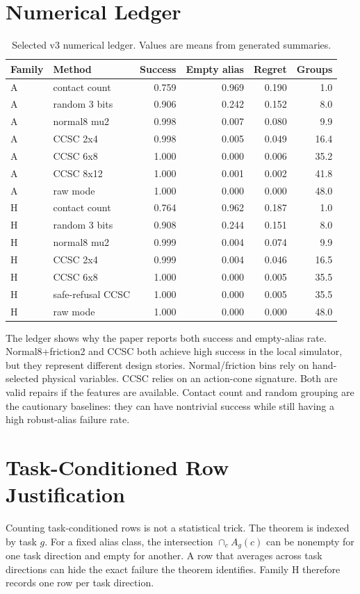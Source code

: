 \documentclass{article}
\begin{document}
\section{Numerical Ledger}
\begin{table}[p]
\centering
\caption{Selected v3 numerical ledger. Values are means from generated summaries.}
\label{tab:numerical-ledger}
\small
\begin{tabular}{llrrrr}
\toprule
Family & Method & Success & Empty alias & Regret & Groups\\
\midrule
A & contact count & 0.759 & 0.969 & 0.190 & 1.0\\
A & random 3 bits & 0.906 & 0.242 & 0.152 & 8.0\\
A & normal8 mu2 & 0.998 & 0.007 & 0.080 & 9.9\\
A & CCSC 2x4 & 0.998 & 0.005 & 0.049 & 16.4\\
A & CCSC 6x8 & 1.000 & 0.000 & 0.006 & 35.2\\
A & CCSC 8x12 & 1.000 & 0.001 & 0.002 & 41.8\\
A & raw mode & 1.000 & 0.000 & 0.000 & 48.0\\
\midrule
H & contact count & 0.764 & 0.962 & 0.187 & 1.0\\
H & random 3 bits & 0.908 & 0.244 & 0.151 & 8.0\\
H & normal8 mu2 & 0.999 & 0.004 & 0.074 & 9.9\\
H & CCSC 2x4 & 0.999 & 0.004 & 0.046 & 16.5\\
H & CCSC 6x8 & 1.000 & 0.000 & 0.005 & 35.5\\
H & safe-refusal CCSC & 1.000 & 0.000 & 0.005 & 35.5\\
H & raw mode & 1.000 & 0.000 & 0.000 & 48.0\\
\bottomrule
\end{tabular}
\end{table}

The ledger shows why the paper reports both success and empty-alias rate. Normal8+friction2 and CCSC both achieve high success in the local simulator, but they represent different design stories. Normal/friction bins rely on hand-selected physical variables. CCSC relies on an action-cone signature. Both are valid repairs if the features are available. Contact count and random grouping are the cautionary baselines: they can have nontrivial success while still having a high robust-alias failure rate.

\section{Task-Conditioned Row Justification}
Counting task-conditioned rows is not a statistical trick. The theorem is indexed by task $g$. For a fixed alias class, the intersection $\cap_c A_g(c)$ can be nonempty for one task direction and empty for another. A row that averages across task directions can hide the exact failure the theorem identifies. Family H therefore records one row per task direction.
\end{document}
